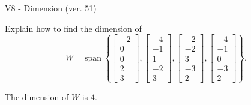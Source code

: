 \begin{exercise}
  \begin{exerciseTitle}V8 - Dimension (ver. 51)\end{exerciseTitle}
  \begin{exerciseStatement}
    Explain how to find the dimension of 
\[W=\mathrm{span}\ \left\{\left[\begin{array}{r}
-2 \\
0 \\
0 \\
2 \\
3
\end{array}\right] , \left[\begin{array}{r}
-4 \\
-1 \\
1 \\
-2 \\
3
\end{array}\right] , \left[\begin{array}{r}
-2 \\
-2 \\
3 \\
-3 \\
2
\end{array}\right] , \left[\begin{array}{r}
-4 \\
-1 \\
0 \\
-3 \\
2
\end{array}\right]\right\}.\]



  \end{exerciseStatement}
  \begin{exerciseAnswer}
   The dimension of \(W\) is  \(4\).
  


  \end{exerciseAnswer}
\end{exercise}